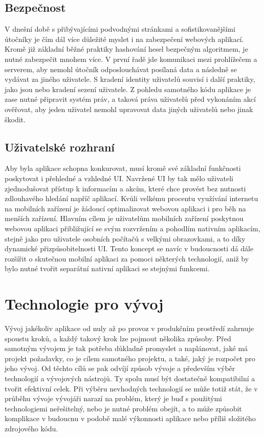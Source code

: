 	\subsection{Bezpečnost}

	V dnešní době s přibývajícími podvodnými stránkami a sofistikovanějšími útočníky je čím dál více důležité myslet i
	na zabezpečení webových aplikací.
	Kromě již základní běžné praktiky hashování hesel bezpečným algoritmem, je nutné zabezpečit mnohem více.
	V první řadě jde komunikaci mezi prohlížečem a serverem, aby nemohl útočník odposlouchávat posílaná data a následně
	se vydávat za jiného uživatele.
	S kradení identity uživatelů souvisí i další praktiky, jako jsou  nebo kradení sezení uživatele.
	Z pohledu samotného kódu aplikace je zase nutné připravit systém práv, a taková práva uživatelů před vykonáním
	akcí ověřovat, aby jeden uživatel nemohl upravovat data jiných uživatelů nebo jinak škodit.

	\subsection{Uživatelské rozhraní}

	Aby byla aplikace schopna konkurovat, musí kromě své základní funkčnosti poskytovat i přehledné
	a vzhledné \ac{UI}.
	Navržené \ac{UI} by tak mělo uživateli zjednodušovat přístup k informacím a akcím, které chce provést bez nutnosti
	zdlouhavého hledání napříč aplikací.
	Kvůli velkému procentu využívání internetu na mobilních zařízení je žádoucí optimalizovat webovou aplikaci i pro běh
	na menších zařízení.
	Hlavním cílem je uživatelům mobilních zařízení poskytnou webovou aplikaci přibližující se svým rozvržením a pohodlím
	nativním aplikacím, stejně jako pro uživatele osobních počítačů s velkými obrazovkami, a to díky dynamické
	přizpůsobitelnosti \ac{UI}.
	Tento koncept se navíc v budoucnosti dá dále rozšířit o skutečnou mobilní aplikaci za pomoci některých technologií,
	aniž by bylo nutné tvořit separátní nativní aplikaci se stejnými funkcemi.

\section{Technologie pro vývoj}

Vývoj jakékoliv aplikace od nuly až po provoz v produkčním prostředí zahrnuje spoustu kroků, a každý takový krok
lze pojmout několika způsoby.
Před samotným vývojem je tak potřeba důkladně promyslet a naplánovat, jaké má projekt požadavky, co je cílem samotného projektu,
a také, jaký je rozpočet pro jeho vývoj.
Od těchto cílů se pak odvíjí způsob vývoje a především výběr technologií a vývojových nástrojů.
Ty spolu musí být dostatečně kompatibilní a tvořit efektivní celek.
Při výběru nevhodných technologií se může totiž stát, že v průběhu vývoje vývojáři narazí na problém, který je buď
s použitými technologiemi neřešitelný, nebo
je nutné problém obejít, a to může způsobit komplikace v budoucnu v podobě malé výkonnosti aplikace nebo příliš
složitého zdrojového kódu.

